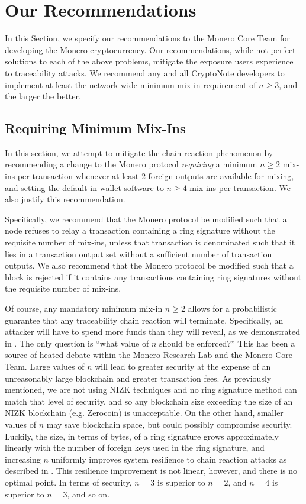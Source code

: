 \documentclass[12pt,english]{mrl}
\theoremstyle{definition}
\renewcommand{\geq}{\geqslant}
\numberwithin{equation}{section}
\numberwithin{figure}{section}
\numberwithin{equation}{section}
\numberwithin{equation}{section}
\numberwithin{figure}{section}
\begin{document}
\section{Our Recommendations}\label{Recommendations}

In this Section, we specify our recommendations to the Monero Core Team for developing the Monero cryptocurrency. Our recommendations, while not perfect solutions to each of the above problems, mitigate the exposure users experience to traceability attacks. We recommend any and all CryptoNote developers to implement at least the network-wide minimum mix-in requirement of $n\geq 3$, and the larger the better.

\subsection{Requiring Minimum Mix-Ins}\label{minMixIn}

In this section, we attempt to mitigate the chain reaction phenomenon by recommending a change to the Monero protocol \textit{requiring} a minimum $n\geq 2$ mix-ins per transaction whenever at least $2$ foreign outputs are available for mixing, and setting the default in wallet software to $n\geq 4$ mix-ins per transaction. We also justify this recommendation. 

Specifically, we recommend that the Monero protocol be modified such that a node refuses to relay a transaction containing a ring signature without the requisite number of mix-ins, unless that transaction is denominated such that it lies in a transaction output set without a sufficient number of transaction outputs. We also recommend that the Monero protocol be modified such that a block is rejected if it contains any transactions containing ring signatures without the requisite number of mix-ins.

Of course, any mandatory minimum mix-in $n \geq 2$ allows for a probabilistic guarantee that any traceability chain reaction will terminate. Specifically, an attacker will have to spend more funds than they will reveal, as we demonstrated in \cite{chainReactions}. The only question is ``what value of $n$ should be enforced?'' This has been a source of heated debate within the Monero Research Lab and the Monero Core Team. Large values of $n$ will lead to greater security at the expense of an unreasonably large blockchain and greater transaction fees. As previously mentioned, we are not using NIZK techniques and no ring signature method can match that level of security, and so any blockchain size exceeding the size of an NIZK blockchain (e.g. Zerocoin) is unacceptable. On the other hand, smaller values of $n$ may save blockchain space, but could possibly compromise security. Luckily, the size, in terms of bytes, of a ring signature grows approximately linearly with the number of foreign keys used in the ring signature, and increasing $n$ uniformly improves system resilience to chain reaction attacks as described in \cite{chainReactions}. This resilience improvement is not linear, however, and there is no optimal point. In terms of security, $n=3$ is superior to $n=2$, and $n=4$ is superior to $n=3$, and so on.
\end{document}
